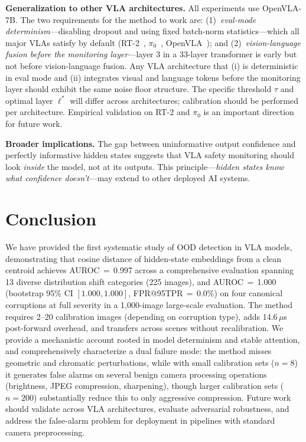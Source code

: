 \documentclass[11pt]{article}
\begin{document}
\textbf{Generalization to other VLA architectures.}
All experiments use OpenVLA-7B.
The two requirements for the method to work are: (1)~\emph{eval-mode determinism}---disabling dropout and using fixed batch-norm statistics---which all major VLAs satisfy by default (RT-2~\cite{brohan2023rt2}, $\pi_0$~\cite{black2024pi0}, OpenVLA~\cite{kim2024openvla}); and (2)~\emph{vision-language fusion before the monitoring layer}---layer 3 in a 33-layer transformer is early but not before vision-language fusion.
Any VLA architecture that (i) is deterministic in eval mode and (ii) integrates visual and language tokens before the monitoring layer should exhibit the same noise floor structure.
The specific threshold $\tau$ and optimal layer $\ell^*$ will differ across architectures; calibration should be performed per architecture.
Empirical validation on RT-2 and $\pi_0$ is an important direction for future work.

\textbf{Broader implications.}
The gap between uninformative output confidence and perfectly informative hidden states suggests that VLA safety monitoring should look \emph{inside} the model, not at its outputs.
This principle---\emph{hidden states know what confidence doesn't}---may extend to other deployed AI systems.

\section{Conclusion}
\label{sec:conclusion}

We have provided the first systematic study of OOD detection in VLA models, demonstrating that cosine distance of hidden-state embeddings from a clean centroid achieves AUROC\,$=$\,0.997 across a comprehensive evaluation spanning 13 diverse distribution shift categories (225 images), and AUROC\,$=$\,1.000 (bootstrap 95\% CI $[1.000, 1.000]$, FPR@95TPR\,$=$\,0.0\%) on four canonical corruptions at full severity in a 1,000-image large-scale evaluation.
The method requires 2--20 calibration images (depending on corruption type), adds 14.6\,$\mu$s post-forward overhead, and transfers across scenes without recalibration.
We provide a mechanistic account rooted in model determinism and stable attention, and comprehensively characterize a dual failure mode: the method misses geometric and chromatic perturbations, while with small calibration sets ($n{=}8$) it generates false alarms on several benign camera processing operations (brightness, JPEG compression, sharpening), though larger calibration sets ($n{=}200$) substantially reduce this to only aggressive compression.
Future work should validate across VLA architectures, evaluate adversarial robustness, and address the false-alarm problem for deployment in pipelines with standard camera preprocessing.
\end{document}

